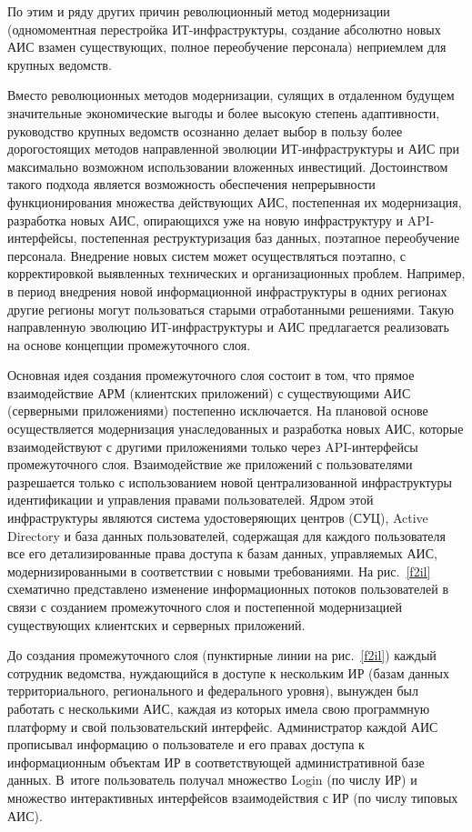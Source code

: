 \begin{multicols}{2}
      По этим и ряду других причин революционный метод модернизации (одномоментная 
перестройка ИТ-ин\-фра\-струк\-ту\-ры, создание абсолютно новых АИС взамен существующих, 
полное переобучение персонала) неприемлем для крупных ведомств.
      
      Вместо революционных методов модернизации, сулящих в отдаленном будущем 
значительные экономические выгоды и более высокую степень адап\-тив\-ности, руководство 
крупных ведомств осознанно делает выбор в пользу более дорогостоящих мето\-дов 
направленной эволюции ИТ-ин\-фра\-струк\-ту\-ры и АИС при максимально возможном 
использовании вложенных инвестиций. Достоинством такого подхода является возможность 
обеспечения непрерывности функционирования множества действующих АИС, постепенная 
их модернизация, разработка новых АИС, опирающихся уже на новую инфраструктуру и 
      API-ин\-тер\-фей\-сы, постепенная реструктуризация баз данных, поэтапное переобучение 
персонала. Внедрение новых систем может осуществляться поэтапно, с корректировкой 
выявленных технических и организационных проблем. Например, в период внедрения новой 
информационной инфраструктуры в одних регионах другие регионы могут пользоваться 
старыми отработанными решениями. Такую направленную эволюцию ИТ-ин\-фра\-струк\-ту\-ры и 
АИС предлагается реализовать на основе концепции промежуточного слоя.
      
      Основная идея создания промежуточного слоя состоит в том, что прямое 
взаимодействие АРМ (клиентских приложений) с существующими АИС (серверными 
приложениями) постепенно исключается. На плановой основе осуществляется модернизация 
унаследованных и разработка новых АИС, которые взаимодействуют с другими 
приложениями только через API-ин\-тер\-фей\-сы промежуточного слоя. Взаимодействие же 
приложений с пользователями разрешается только с использованием новой централизованной 
инфраструктуры идентификации и управления правами пользователей. Ядром этой 
инфраструктуры являются сис\-те\-ма удостоверяющих центров (СУЦ), Active Directory и база данных 
пользователей, содержащая для каждого пользователя все его детализированные права 
доступа к базам данных, управляемых АИС, модернизированными в соответствии с новыми 
требованиями. На рис.~\ref{f2il} схематично представлено изменение информационных 
потоков пользователей в связи с созданием промежуточного слоя и постепенной 
модернизацией существующих клиентских и серверных приложений.
      


      До создания промежуточного слоя (пунктирные линии на рис.~\ref{f2il}) каждый 
сотрудник ведомства, нуждающийся в доступе к нескольким ИР (базам данных 
территориального, регионального и федерального уровня), вынужден был работать с 
несколькими АИС, каждая из которых имела свою программную платформу и свой 
пользовательский интерфейс. Администратор каждой АИС прописывал информацию о 
пользователе и его правах доступа к информационным объектам ИР в соответствующей 
административной базе данных. В~итоге пользователь получал множество Login (по числу ИР) 
и множество интерактивных интерфейсов взаимодействия с ИР (по числу типовых АИС).
      

\end{multicols}
